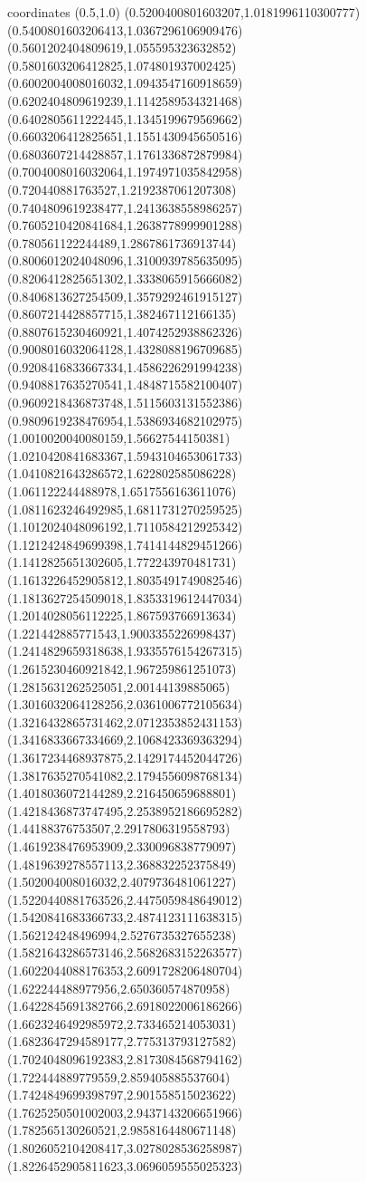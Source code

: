 coordinates {%
(0.5,1.0)
(0.5200400801603207,1.0181996110300777)
(0.5400801603206413,1.0367296106909476)
(0.5601202404809619,1.055595323632852)
(0.5801603206412825,1.074801937002425)
(0.6002004008016032,1.0943547160918659)
(0.6202404809619239,1.1142589534321468)
(0.6402805611222445,1.1345199679569662)
(0.6603206412825651,1.1551430945650516)
(0.6803607214428857,1.1761336872879984)
(0.7004008016032064,1.1974971035842958)
(0.720440881763527,1.2192387061207308)
(0.7404809619238477,1.2413638558986257)
(0.7605210420841684,1.2638778999901288)
(0.780561122244489,1.2867861736913744)
(0.8006012024048096,1.3100939785635095)
(0.8206412825651302,1.3338065915666082)
(0.8406813627254509,1.3579292461915127)
(0.8607214428857715,1.382467112166135)
(0.8807615230460921,1.4074252938862326)
(0.9008016032064128,1.4328088196709685)
(0.9208416833667334,1.4586226291994238)
(0.9408817635270541,1.4848715582100407)
(0.9609218436873748,1.5115603131552386)
(0.9809619238476954,1.5386934682102975)
(1.0010020040080159,1.56627544150381)
(1.0210420841683367,1.5943104653061733)
(1.0410821643286572,1.622802585086228)
(1.061122244488978,1.6517556163611076)
(1.0811623246492985,1.6811731270259525)
(1.1012024048096192,1.7110584212925342)
(1.1212424849699398,1.7414144829451266)
(1.1412825651302605,1.772243970481731)
(1.1613226452905812,1.8035491749082546)
(1.1813627254509018,1.8353319612447034)
(1.2014028056112225,1.867593766913634)
(1.221442885771543,1.9003355226998437)
(1.2414829659318638,1.9335576154267315)
(1.2615230460921842,1.967259861251073)
(1.2815631262525051,2.00144139885065)
(1.3016032064128256,2.0361006772105634)
(1.3216432865731462,2.0712353852431153)
(1.3416833667334669,2.1068423369363294)
(1.3617234468937875,2.1429174452044726)
(1.3817635270541082,2.1794556098768134)
(1.4018036072144289,2.216450659688801)
(1.4218436873747495,2.2538952186695282)
(1.44188376753507,2.2917806319558793)
(1.4619238476953909,2.330096838779097)
(1.4819639278557113,2.368832252375849)
(1.502004008016032,2.4079736481061227)
(1.5220440881763526,2.4475059848649012)
(1.5420841683366733,2.4874123111638315)
(1.562124248496994,2.5276735327655238)
(1.5821643286573146,2.5682683152263577)
(1.6022044088176353,2.6091728206480704)
(1.622244488977956,2.650360574870958)
(1.6422845691382766,2.6918022006186266)
(1.6623246492985972,2.733465214053031)
(1.6823647294589177,2.775313793127582)
(1.7024048096192383,2.8173084568794162)
(1.722444889779559,2.859405885537604)
(1.7424849699398797,2.901558515023622)
(1.7625250501002003,2.9437143206651966)
(1.782565130260521,2.9858164480671148)
(1.8026052104208417,3.0278028536258987)
(1.8226452905811623,3.0696059555025323)
}
